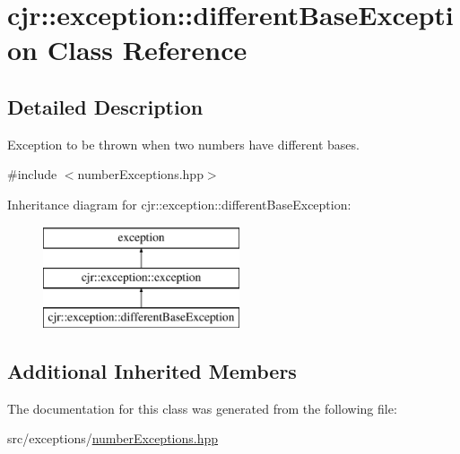 \hypertarget{classcjr_1_1exception_1_1different_base_exception}{\section{cjr\-:\-:exception\-:\-:different\-Base\-Exception Class Reference}
\label{classcjr_1_1exception_1_1different_base_exception}
}


\subsection{Detailed Description}
Exception to be thrown when two numbers have different bases. 

{\ttfamily \#include $<$number\-Exceptions.\-hpp$>$}

Inheritance diagram for cjr\-:\-:exception\-:\-:different\-Base\-Exception\-:\begin{figure}[H]
\begin{center}
\leavevmode
\includegraphics[height=3.000000cm]{classcjr_1_1exception_1_1different_base_exception}
\end{center}
\end{figure}
\subsection*{Additional Inherited Members}


The documentation for this class was generated from the following file\-:\begin{DoxyCompactItemize}
\item 
src/exceptions/\hyperlink{number_exceptions_8hpp}{number\-Exceptions.\-hpp}\end{DoxyCompactItemize}
